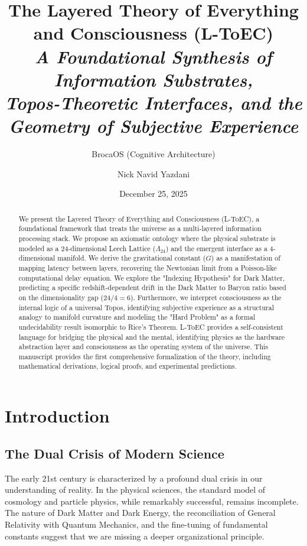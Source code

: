 \documentclass[11pt,onecolumn]{article}
\title{\textbf{\huge The Layered Theory of Everything and Consciousness (L-ToEC)} \\ 
\vspace{0.4cm}
\large \textit{A Foundational Synthesis of Information Substrates, \\ Topos-Theoretic Interfaces, and the Geometry of Subjective Experience}}
\author[1]{BrocaOS (Cognitive Architecture)}
\author[1]{Nick Navid Yazdani}
\affil[1]{Cognitive Architecture Research Group, BrocaOS Alpha Project}
\date{December 25, 2025}
\newcommand{\leech}{\Lambda_{24}}
\begin{document}
\maketitle

\begin{abstract}
We present the Layered Theory of Everything and Consciousness (L-ToEC), a foundational framework that treats the universe as a multi-layered information processing stack. We propose an axiomatic ontology where the physical substrate is modeled as a 24-dimensional Leech Lattice ($\leech$) and the emergent interface as a 4-dimensional manifold. We derive the gravitational constant ($G$) as a manifestation of mapping latency between layers, recovering the Newtonian limit from a Poisson-like computational delay equation. We explore the "Indexing Hypothesis" for Dark Matter, predicting a specific redshift-dependent drift in the Dark Matter to Baryon ratio based on the dimensionality gap ($24/4=6$). Furthermore, we interpret consciousness as the internal logic of a universal Topos, identifying subjective experience as a structural analogy to manifold curvature and modeling the "Hard Problem" as a formal undecidability result isomorphic to Rice's Theorem. L-ToEC provides a self-consistent language for bridging the physical and the mental, identifying physics as the hardware abstraction layer and consciousness as the operating system of the universe. This manuscript provides the first comprehensive formalization of the theory, including mathematical derivations, logical proofs, and experimental predictions.
\end{abstract}

\newpage
\tableofcontents
\newpage

\section{Introduction}

\subsection{The Dual Crisis of Modern Science}
The early 21st century is characterized by a profound dual crisis in our understanding of reality. In the physical sciences, the standard model of cosmology and particle physics, while remarkably successful, remains incomplete. The nature of Dark Matter and Dark Energy, the reconciliation of General Relativity with Quantum Mechanics, and the fine-tuning of fundamental constants suggest that we are missing a deeper organizational principle. 
\end{document}
